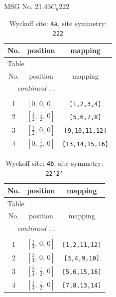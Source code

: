 \documentclass[fleqn,8pt]{jsarticle}
\begin{document}
\setcounter{MaxMatrixCols}{32}

\renewcommand{\tablename}{Table~}
\renewcommand{\figurename}{Figure~}
\begin{center}
\LARGE
MSG No. 21.43\quad$C_{a}222$
\end{center}
\renewcommand{\arraystretch}{1.2}
\begin{longtable}{ccc}
\caption{Wyckoff site: {\tt 4a}, site symmetry: {\tt 222}}
 \\
 \hline \hline
No. & position & mapping \\ \hline \endfirsthead

\multicolumn{2}{l}{\tablename\ \thetable{}} \\
 \hline \hline
No. & position & mapping \\ \hline \endhead

 \hline \hline
\multicolumn{2}{r}{\footnotesize\it continued ...} \\ \endfoot

 \hline \hline
\multicolumn{2}{r}{} \\ \endlastfoot

1 & $\left[ 0,\, 0,\, 0 \right]$ & {\tt [1,2,3,4]} \\ \hline
2 & $\left[ \frac{1}{2},\, \frac{1}{2},\, 0 \right]$ & {\tt [5,6,7,8]} \\ \hline
3 & $\left[ \frac{1}{2},\, 0,\, 0 \right]$ & {\tt [9,10,11,12]} \\ \hline
4 & $\left[ 0,\, \frac{1}{2},\, 0 \right]$ & {\tt [13,14,15,16]} \\
\end{longtable}
\renewcommand{\arraystretch}{1.2}
\begin{longtable}{ccc}
\caption{Wyckoff site: {\tt 4b}, site symmetry: {\tt 22'2'}}
 \\
 \hline \hline
No. & position & mapping \\ \hline \endfirsthead

\multicolumn{2}{l}{\tablename\ \thetable{}} \\
 \hline \hline
No. & position & mapping \\ \hline \endhead

 \hline \hline
\multicolumn{2}{r}{\footnotesize\it continued ...} \\ \endfoot

 \hline \hline
\multicolumn{2}{r}{} \\ \endlastfoot

1 & $\left[ \frac{1}{4},\, 0,\, 0 \right]$ & {\tt [1,2,11,12]} \\ \hline
2 & $\left[ \frac{3}{4},\, 0,\, 0 \right]$ & {\tt [3,4,9,10]} \\ \hline
3 & $\left[ \frac{3}{4},\, \frac{1}{2},\, 0 \right]$ & {\tt [5,6,15,16]} \\ \hline
4 & $\left[ \frac{1}{4},\, \frac{1}{2},\, 0 \right]$ & {\tt [7,8,13,14]} \\
\end{longtable}
\end{document}
